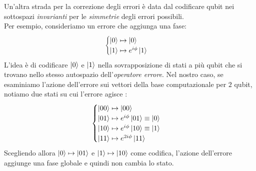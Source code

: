 \documentclass[../../InformazioneQuantistica.tex]{subfiles}
\begin{document}
Un'altra strada per la correzione degli errori è data dal codificare qubit nei sottospazi \textit{invarianti} per le \textit{simmetrie} degli errori possibili.\\
Per esempio, consideriamo un errore che aggiunga una fase:
\begin{align*}
\begin{cases}
\Ket{0} \mapsto \Ket{0}\\
\Ket{1} \mapsto e^{i\phi}\Ket{1}
\end{cases}
\end{align*}
L'idea è di codificare $\Ket{0}$ e $\Ket{1}$ nella sovrapposizione di stati a più qubit che si trovano nello stesso autospazio dell'\textit{operatore errore}. Nel nostro caso, se esaminiamo l'azione dell'errore sui vettori della base computazionale per $2$ qubit, notiamo due stati su cui l'errore agisce :
\begin{align*}
\begin{cases}
\Ket{00} \mapsto \Ket{00}\\
\Ket{01} \mapsto e^{i\phi}\Ket{01} \equiv \Ket{0}\\
\Ket{10} \mapsto e^{i\phi}\Ket{10} \equiv \Ket{1}\\
\Ket{11} \mapsto e^{2i\phi} \Ket{11}
\end{cases}
\end{align*}
Scegliendo allora $\Ket{0} \mapsto \Ket{01}$ e $\Ket{1} \mapsto \Ket{10}$ come codifica, l'azione dell'errore aggiunge una fase globale e quindi non cambia lo stato.
\end{document}
